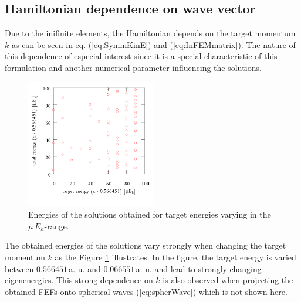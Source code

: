 \subsection{Hamiltonian dependence on wave vector}
Due to the inifinite elements, the Hamiltonian depends on the target momentum $k$ as can be seen in eq. (\ref{eq:SymmKinE}) and (\ref{eq:InFEMmatrix}).
The nature of this dependence of especial interest since it is a special characteristic of this formulation and another numerical parameter influencing the solutions.
\begin{figure}
\includegraphics[width=0.5\textwidth]{Figures/E_k_benchmark}
\caption{Energies of the solutions obtained for target energies varying in the $\mu\,E_h$-range.}
\label{fig:E_k_bm}
\end{figure}
The obtained energies of the solutions vary strongly when changing the target momentum $k$ as the Figure \ref{fig:E_k_bm} illustrates.
In the figure, the target energy is varied between $0.566451\,$a. u. and $0.066551\,$a. u. and lead to strongly changing eigenenergies.
This strong dependence on $k$ is also observed when projecting the obtained FEFs onto spherical waves (\ref{eq:spherWave}) which is not shown here.

